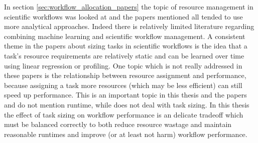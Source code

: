 In section \ref{sec:workflow_allocation_papers} the topic of resource management in scientific workflows was looked at and the papers mentioned all tended to use more analytical approaches. Indeed there is relatively limited literature regarding combining machine learning and scientific workflow management. A consistent theme in the papers about sizing tasks in scientific workflows is the idea that a task’s resource requirements are relatively static and can be learned over time using linear regression or profiling.  One topic which is not really addressed in these papers is the relationship between resource assignment and performance, because assigning a task more resources (which may be less efficient) can still speed up performance. This is an important topic in this thesis and the papers \cite{FeedbackBasedAllocation} and \cite{tovarjob} do not mention runtime, while \cite{tarema} does not deal with task sizing. In this thesis the effect of task sizing on workflow performance is an delicate tradeoff which must be balanced correctly to both reduce resource wastage and maintain reasonable runtimes and improve (or at least not harm) workflow performance.

